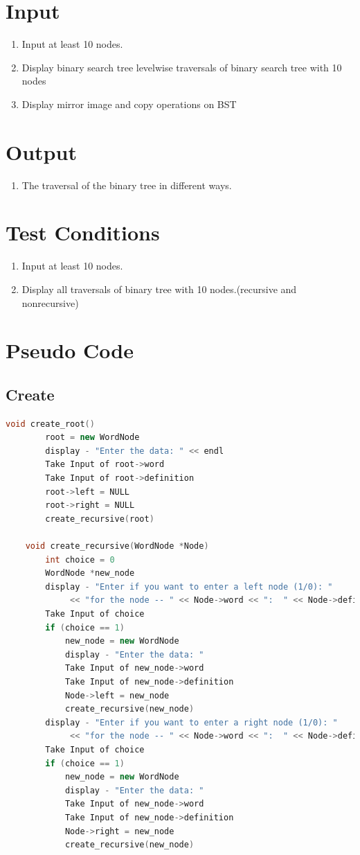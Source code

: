 \documentclass[11pt]{article}
\begin{document}
\section{Input}
\begin{enumerate}
	\item Input at least 10 nodes.
	\item Display binary search tree levelwise traversals of binary search tree with 10 nodes
	\item Display mirror image and copy operations on BST
\end{enumerate}
\section{Output}
\begin{enumerate}
	\item The traversal of the binary tree in different ways.
\end{enumerate}

\section{Test Conditions}
\begin{enumerate}
	\item Input at least 10 nodes.
	\item Display all traversals of binary tree with 10 nodes.(recursive and nonrecursive)
\end{enumerate}

\section{Pseudo Code}
\subsection{Create}
\begin{lstlisting}[language=C++]
	void create_root()
        root = new WordNode
        display - "Enter the data: " << endl
        Take Input of root->word
        Take Input of root->definition
        root->left = NULL
        root->right = NULL
        create_recursive(root)

    void create_recursive(WordNode *Node)
        int choice = 0
        WordNode *new_node
        display - "Enter if you want to enter a left node (1/0): "
             << "for the node -- " << Node->word << ":  " << Node->definition << "-- "
        Take Input of choice
        if (choice == 1)
            new_node = new WordNode
            display - "Enter the data: "
            Take Input of new_node->word
            Take Input of new_node->definition
            Node->left = new_node
            create_recursive(new_node)
        display - "Enter if you want to enter a right node (1/0): "
             << "for the node -- " << Node->word << ":  " << Node->definition << "-- "
        Take Input of choice
        if (choice == 1)
            new_node = new WordNode
            display - "Enter the data: "
            Take Input of new_node->word
            Take Input of new_node->definition
            Node->right = new_node
            create_recursive(new_node)
\end{lstlisting}
\end{document}
